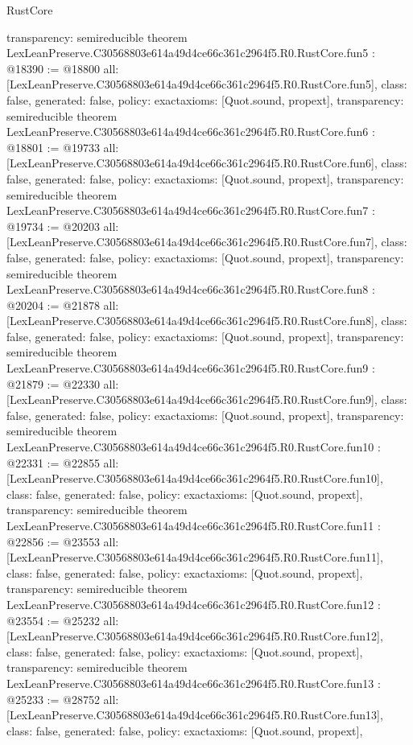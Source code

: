 \begin{lexlean}{RustCore}
\begin{coremodule}
{  transparency: semireducible
}
theorem LexLeanPreserve.C30568803e614a49d4ce66c361c2964f5.R0.RustCore.fun5 : @18390 := @18800 {
  all: [LexLeanPreserve.C30568803e614a49d4ce66c361c2964f5.R0.RustCore.fun5],
  class: false,
  generated: false,
  policy: exact{axioms: [Quot.sound, propext]},
  transparency: semireducible
}
theorem LexLeanPreserve.C30568803e614a49d4ce66c361c2964f5.R0.RustCore.fun6 : @18801 := @19733 {
  all: [LexLeanPreserve.C30568803e614a49d4ce66c361c2964f5.R0.RustCore.fun6],
  class: false,
  generated: false,
  policy: exact{axioms: [Quot.sound, propext]},
  transparency: semireducible
}
theorem LexLeanPreserve.C30568803e614a49d4ce66c361c2964f5.R0.RustCore.fun7 : @19734 := @20203 {
  all: [LexLeanPreserve.C30568803e614a49d4ce66c361c2964f5.R0.RustCore.fun7],
  class: false,
  generated: false,
  policy: exact{axioms: [Quot.sound, propext]},
  transparency: semireducible
}
theorem LexLeanPreserve.C30568803e614a49d4ce66c361c2964f5.R0.RustCore.fun8 : @20204 := @21878 {
  all: [LexLeanPreserve.C30568803e614a49d4ce66c361c2964f5.R0.RustCore.fun8],
  class: false,
  generated: false,
  policy: exact{axioms: [Quot.sound, propext]},
  transparency: semireducible
}
theorem LexLeanPreserve.C30568803e614a49d4ce66c361c2964f5.R0.RustCore.fun9 : @21879 := @22330 {
  all: [LexLeanPreserve.C30568803e614a49d4ce66c361c2964f5.R0.RustCore.fun9],
  class: false,
  generated: false,
  policy: exact{axioms: [Quot.sound, propext]},
  transparency: semireducible
}
theorem LexLeanPreserve.C30568803e614a49d4ce66c361c2964f5.R0.RustCore.fun10 : @22331 := @22855 {
  all: [LexLeanPreserve.C30568803e614a49d4ce66c361c2964f5.R0.RustCore.fun10],
  class: false,
  generated: false,
  policy: exact{axioms: [Quot.sound, propext]},
  transparency: semireducible
}
theorem LexLeanPreserve.C30568803e614a49d4ce66c361c2964f5.R0.RustCore.fun11 : @22856 := @23553 {
  all: [LexLeanPreserve.C30568803e614a49d4ce66c361c2964f5.R0.RustCore.fun11],
  class: false,
  generated: false,
  policy: exact{axioms: [Quot.sound, propext]},
  transparency: semireducible
}
theorem LexLeanPreserve.C30568803e614a49d4ce66c361c2964f5.R0.RustCore.fun12 : @23554 := @25232 {
  all: [LexLeanPreserve.C30568803e614a49d4ce66c361c2964f5.R0.RustCore.fun12],
  class: false,
  generated: false,
  policy: exact{axioms: [Quot.sound, propext]},
  transparency: semireducible
}
theorem LexLeanPreserve.C30568803e614a49d4ce66c361c2964f5.R0.RustCore.fun13 : @25233 := @28752 {
  all: [LexLeanPreserve.C30568803e614a49d4ce66c361c2964f5.R0.RustCore.fun13],
  class: false,
  generated: false,
  policy: exact{axioms: [Quot.sound, propext]},
}
\end{coremodule}
\end{lexlean}
